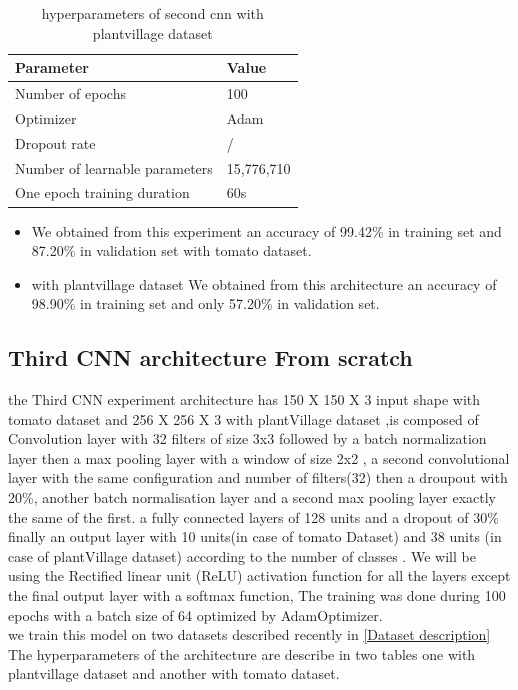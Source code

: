 \begin{table}[H]
\begin{tabular}{@{}|p{9cm}|p{3cm}|@{}}
\hline
 \centering \textbf{Parameter} & \textbf{Value}  \\ \hline
 Number of epochs & 100  \\  \hline
 Optimizer & Adam \\ \hline
 Dropout rate & / \\ \hline
 Number of learnable parameters & 15,776,710 \\ \hline
 One epoch training duration & 60s \\ \hline
 
\end{tabular}
\caption{hyperparameters of second cnn with plantvillage dataset}
\end{table}
\begin{itemize}
    \item We obtained from this experiment an accuracy of 99.42\% in training set and 87.20\% in validation set with tomato dataset.
    \item with plantvillage dataset We obtained from this architecture an accuracy of 98.90\% in training set and only 57.20\% in validation set.
\end{itemize}
\subsection{Third CNN architecture From scratch}
the Third CNN experiment architecture has 150 X 150 X 3 input shape with tomato dataset and 256 X 256 X 3 with plantVillage dataset ,is composed of Convolution layer with 32 filters of size 3x3 followed by a batch normalization layer then
a max pooling layer with a window of size 2x2 , a second convolutional layer with the same configuration and number of filters(32) then a droupout with 20\%, another batch normalisation layer
and a second max pooling layer exactly the same of the first. 
a fully connected layers of 128 units and a dropout of 30\% finally an output layer with 10 units(in case of tomato Dataset) and 38 units (in case of plantVillage dataset) according to the number of classes .
We will be using the Rectified linear unit (ReLU) activation
function for all the layers except the final output layer with a softmax function,
The training was done
during 100 epochs with a batch size of 64 optimized by AdamOptimizer.\\
we train this model on two datasets described recently in \ref{Dataset description}
The hyperparameters of the architecture are
describe in two tables one with plantvillage dataset and another with tomato dataset.\\

